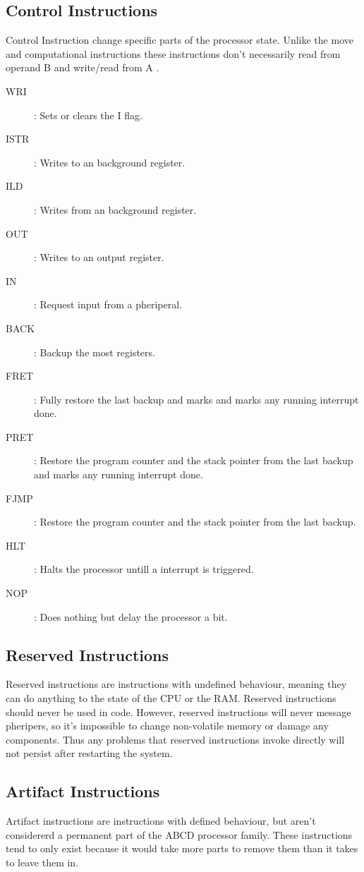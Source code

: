 \documentclass[oneside, a4paper]{memoir}
\begin{document}
\subsection{Control Instructions}
Control Instruction change specific parts of the processor state. Unlike the move and computational instructions these instructions don't necessarily read from operand B and write/read from A .
\begin{description}
\item[WRI]: Sets or clears the I flag.
\item[ISTR]: Writes to an background register.
\item[ILD]: Writes from an background register.
\item[OUT]: Writes to an output register.
\item[IN]: Request input from a pheriperal.
\item[BACK]: Backup the most registers.
\item[FRET]: Fully restore the last backup and marks and marks any running interrupt done.
\item[PRET]: Restore the program counter and the stack pointer from the last backup and marks any running interrupt done.
\item[FJMP]: Restore the program counter and the stack pointer from the last backup.
\item[HLT]: Halts the processor untill a interrupt is triggered.
\item[NOP]: Does nothing but delay the processor a bit.
\end{description}
\subsection{Reserved Instructions}
Reserved instructions are instructions with undefined behaviour, meaning they can do anything to the state of the CPU or the RAM. Reserved instructions should never be used in code. However, reserved instructions will never message pheripers, so it's impossible to change non-volatile memory or damage any components. Thus any problems that reserved instructions invoke directly will not persist after restarting the system. 
\subsection{Artifact Instructions}
Artifact instructions are instructions with defined behaviour, but aren't considererd a permanent part of the ABCD processor family. These instructions tend to only exist because it would take more parts to remove them than it takes to leave them in.
\end{document}
